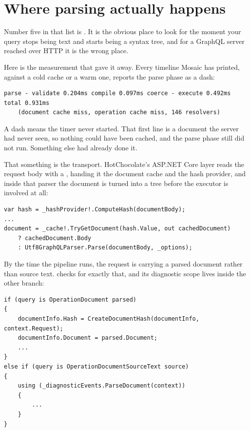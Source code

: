 \section{Where parsing actually happens}
\label{sec:ch03-parsing}

Number five in that list is . It is the obvious
place to look for the moment your query stops being text and starts being a
syntax tree, and for a GraphQL server reached over HTTP it is the wrong place.

Here is the measurement that gave it away. Every timeline Mosaic has printed,
against a cold cache or a warm one, reports the parse phase as a dash:

\begin{verbatim}
parse - validate 0.204ms compile 0.097ms coerce - execute 0.492ms total 0.931ms
    (document cache miss, operation cache miss, 146 resolvers)
\end{verbatim}

A dash means the timer never started. That first line is a document the server
had never seen, so nothing could have been cached, and the parse phase still did
not run. Something else had already done it.

%
That something is the transport. HotChocolate's ASP.NET Core layer reads the
request body with a , handing it the document
cache and the hash provider, and inside that parser the document is turned into
a tree before the executor is involved at all:

\begin{verbatim}
var hash = _hashProvider!.ComputeHash(documentBody);
...
document = _cache!.TryGetDocument(hash.Value, out cachedDocument)
    ? cachedDocument.Body
    : Utf8GraphQLParser.Parse(documentBody, _options);
\end{verbatim}

By the time the pipeline runs, the request is carrying a parsed document rather
than source text.  checks for exactly that, and
its diagnostic scope lives inside the other branch:

\begin{verbatim}
if (query is OperationDocument parsed)
{
    documentInfo.Hash = CreateDocumentHash(documentInfo, context.Request);
    documentInfo.Document = parsed.Document;
    ...
}
else if (query is OperationDocumentSourceText source)
{
    using (_diagnosticEvents.ParseDocument(context))
    {
        ...
    }
}
\end{verbatim}

